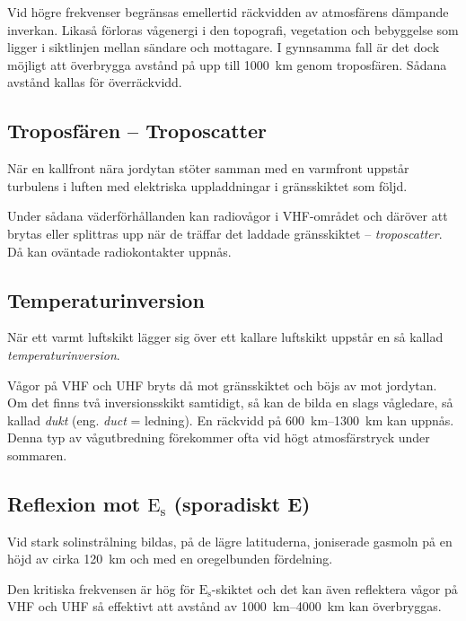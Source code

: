 Vid högre frekvenser begränsas emellertid räckvidden av atmosfärens
dämpande inverkan.
Likaså förloras vågenergi i den topografi, vegetation och bebyggelse som ligger
i siktlinjen mellan sändare och mottagare.
I gynnsamma fall är det dock möjligt att överbrygga avstånd på upp till
\SI{1000}{\kilo\metre} genom troposfären.
Sådana avstånd kallas för överräckvidd.

\subsection{Troposfären -- Troposcatter}

När en kallfront nära jordytan stöter samman med en varmfront uppstår turbulens
i luften med elektriska uppladdningar i gränsskiktet som följd.

Under sådana väderförhållanden kan radiovågor i VHF-området och däröver att
brytas eller splittras upp när de träffar det laddade gränsskiktet --
\emph{troposcatter}.
Då kan oväntade radiokontakter uppnås.

\subsection{Temperaturinversion}

När ett varmt luftskikt lägger sig över ett kallare luftskikt uppstår
en så kallad \emph{temperaturinversion}.

Vågor på VHF och UHF bryts då mot gränsskiktet och böjs av mot jordytan.
Om det finns två inversionsskikt samtidigt, så kan de bilda
en slags vågledare, så kallad \emph{dukt} (eng. \emph{duct} = ledning).
En räckvidd på \SIrange{600}{1300}{\kilo\metre} kan uppnås.
Denna typ av vågutbredning förekommer ofta vid högt atmosfärstryck under
sommaren.

\subsection{Reflexion mot $\mathrm{E_s}$ (sporadiskt E)}

Vid stark solinstrålning bildas, på de lägre latituderna, joniserade gasmoln på
en höjd av cirka \SI{120}{\kilo\metre} och med en oregelbunden fördelning.

Den kritiska frekvensen är hög för \(\mathrm{E_s}\)-skiktet och det kan även
reflektera vågor på VHF och UHF så effektivt att avstånd av
\SIrange{1000}{4000}{\kilo\metre} kan överbryggas.

